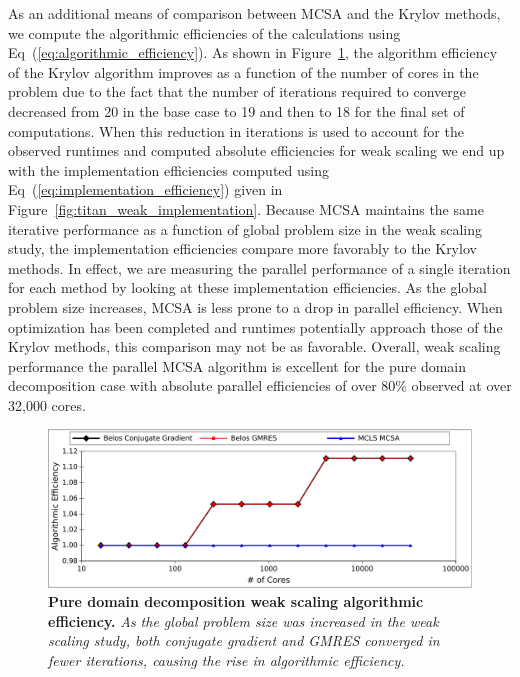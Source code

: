 As an additional means of comparison between MCSA and the Krylov
methods, we compute the algorithmic efficiencies of the calculations
using Eq~(\ref{eq:algorithmic_efficiency}). As shown in
Figure~\ref{fig:titan_weak_algorithmic}, the algorithm efficiency of
the Krylov algorithm improves as a function of the number of cores in
the problem due to the fact that the number of iterations required to
converge decreased from 20 in the base case to 19 and then to 18 for
the final set of computations. When this reduction in iterations is
used to account for the observed runtimes and computed absolute
efficiencies for weak scaling we end up with the implementation
efficiencies computed using Eq~(\ref{eq:implementation_efficiency})
given in Figure~\ref{fig:titan_weak_implementation}. Because MCSA
maintains the same iterative performance as a function of global
problem size in the weak scaling study, the implementation
efficiencies compare more favorably to the Krylov methods. In effect,
we are measuring the parallel performance of a single iteration for
each method by looking at these implementation efficiencies. As the
global problem size increases, MCSA is less prone to a drop in
parallel efficiency. When optimization has been completed and runtimes
potentially approach those of the Krylov methods, this comparison may
not be as favorable. Overall, weak scaling performance the parallel
MCSA algorithm is excellent for the pure domain decomposition case
with absolute parallel efficiencies of over 80\% observed at over
32,000 cores.

\begin{figure}[t!]
  \begin{center}
    \includegraphics[width=6in]{chapters/parallel_mc/titan_weak_alg_eff.pdf}
  \end{center}
  \caption{\textbf{Pure domain decomposition weak scaling algorithmic
      efficiency.} \textit{As the global problem size was increased in
      the weak scaling study, both conjugate gradient and GMRES
      converged in fewer iterations, causing the rise in algorithmic
      efficiency.}}
  \label{fig:titan_weak_algorithmic}
\end{figure}

